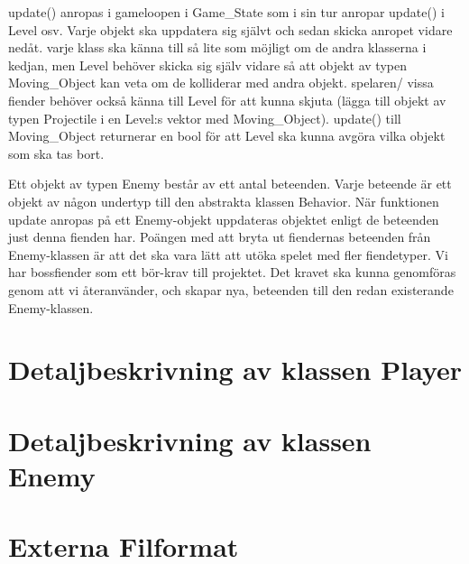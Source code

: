\documentclass{TDP005mall}
\begin{document}
update() anropas i gameloopen i Game\_State som i sin tur anropar update() i Level osv. Varje objekt ska uppdatera sig självt och sedan skicka anropet vidare nedåt. varje klass ska känna till så lite som möjligt om de andra klasserna i kedjan, men Level behöver skicka sig själv vidare så att objekt av typen Moving\_Object kan veta om de kolliderar med andra objekt. spelaren/ vissa fiender behöver också känna till Level för att kunna skjuta (lägga till objekt av typen Projectile i en Level:s vektor med Moving\_Object). update() till Moving\_Object returnerar en bool för att Level ska kunna avgöra vilka objekt som ska tas bort.

Ett objekt av typen Enemy består av ett antal beteenden. Varje beteende är ett objekt av någon undertyp till den abstrakta klassen Behavior. När funktionen update anropas på ett Enemy-objekt uppdateras objektet enligt de beteenden just denna fienden har. Poängen med att bryta ut fiendernas beteenden från Enemy-klassen är att det ska vara lätt att utöka spelet med fler fiendetyper. Vi har bossfiender som ett bör-krav till projektet. Det kravet ska kunna genomföras genom att vi återanvänder, och skapar nya, beteenden till den redan existerande Enemy-klassen.  

\section{Detaljbeskrivning av klassen Player}

\section{Detaljbeskrivning av klassen Enemy}



\section{Externa Filformat}

\newpage
\printbibliography
\end{document}
